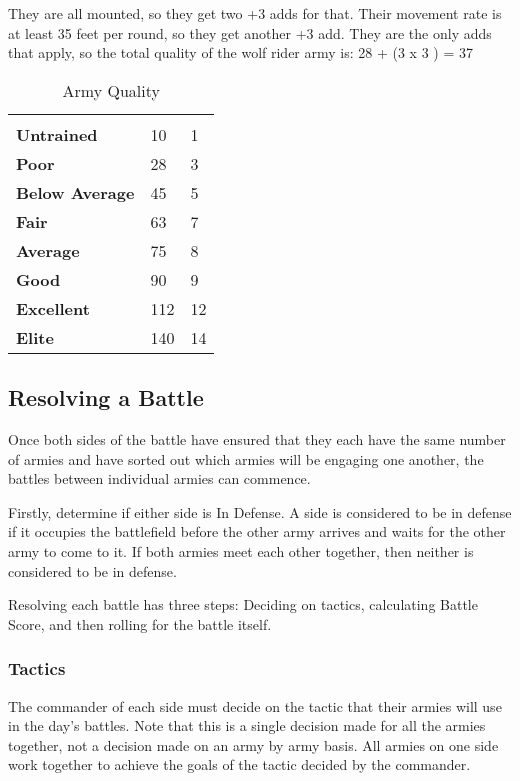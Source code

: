 \begin{multicols*}{2}
{They are all mounted, so they get two +3 adds for that. Their movement rate is at least 35 feet per round, so they get another +3 add. They are the only adds that apply, so the total quality of the wolf rider army is: 28 + (3 x 3 ) = 37}

\begin {table}[H]
	\caption{Army Quality}\label{tab:Army Quality}
  \begin{tabularx}{\columnwidth}{>{\bfseries}YYY}
	 &  & \\
	Untrained & 10 & 1\\
	Poor & 28 & 3\\
	Below Average & 45 & 5\\
	Fair & 63 & 7\\
	Average & 75 & 8\\
	Good & 90 & 9\\
	Excellent & 112 & 12\\
	Elite & 140 & 14
  \end {tabularx}
\end {table}

\subsection{Resolving a Battle}
Once both sides of the battle have ensured that they each have the same number of armies and have sorted out which armies will be engaging one another, the battles between individual armies can commence.

Firstly, determine if either side is In Defense. A side is considered to be in defense if it occupies the battlefield before the other army arrives and waits for the other army to come to it. If both armies meet each other together, then neither is considered to be in defense.

Resolving each battle has three steps: Deciding on tactics, calculating Battle Score, and then rolling for the battle itself.

\subsubsection{Tactics}
The commander of each side must decide on the tactic that their armies will use in the day’s battles. Note that this is a single decision made for all the armies together, not a decision made on an army by army basis. All armies on one side work together to achieve the goals of the tactic decided by the commander.


\end{multicols*}
